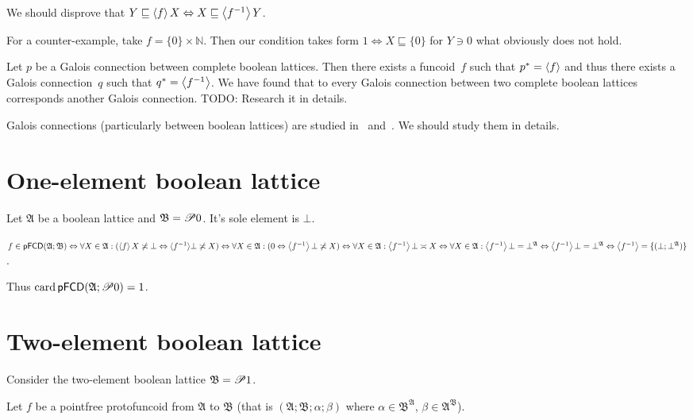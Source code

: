 We should disprove that $Y \sqsubseteq \left\langle f\right\rangle X \Leftrightarrow X
\sqsubseteq \left\langle f^{- 1}\right\rangle Y$.

For a counter-example, take $f = \{ 0 \} \times \mathbb{N}$. Then our
condition takes form $1 \Leftrightarrow X \sqsubseteq \{ 0 \}$ for $Y \ni 0$
what obviously does not hold.

Let $p$ be a Galois connection between complete boolean lattices. Then
there exists a funcoid~$f$ such that $p^\ast = \left\langle f\right\rangle$ and thus there exists
a Galois connection~$q$ such that $q^\ast = \left\langle f^{-1}\right\rangle$. We have found that
to every Galois connection between two complete boolean lattices corresponds
another Galois connection. TODO: Research it in details.

Galois connections (particularly between boolean lattices) are studied in~\cite{tprod-dist-lat}
and~\cite{shmuely1974}. We should study them in details.

\section{One-element boolean lattice}

Let $\mathfrak{A}$ be a boolean lattice and $\mathfrak{B}= \mathscr{P} 0$.
It's sole element is $\bot$.

$f \in \mathsf{pFCD} (\mathfrak{A}; \mathfrak{B}) \Leftrightarrow \forall X \in
\mathfrak{A}: (\left\langle f\right\rangle X \not\asymp \bot \Leftrightarrow \langle f^{-
1} \rangle \bot \not\asymp X) \Leftrightarrow \forall X \in \mathfrak{A}: (0
\Leftrightarrow \left\langle f^{- 1}\right\rangle \bot \not\asymp X) \Leftrightarrow
\forall X \in \mathfrak{A}: \left\langle f^{- 1}\right\rangle \bot \asymp X
\Leftrightarrow \forall X \in \mathfrak{A}: \left\langle f^{- 1}\right\rangle \bot =
\bot^{\mathfrak{A}} \Leftrightarrow \left\langle f^{- 1}\right\rangle \bot =
\bot^{\mathfrak{A}} \Leftrightarrow \left\langle f^{- 1}\right\rangle = \{ (\bot ;
\bot^{\mathfrak{A}}) \}$.

Thus $\operatorname{card} \mathsf{pFCD} (\mathfrak{A}; \mathscr{P} 0) = 1$.

\section{Two-element boolean lattice}

Consider the two-element boolean lattice $\mathfrak{B}= \mathscr{P} 1$.

Let $f$ be a pointfree protofuncoid from $\mathfrak{A}$ to $\mathfrak{B}$
(that is $(\mathfrak{A};\mathfrak{B};\alpha;\beta)$ where $\alpha\in\mathfrak{B}^{\mathfrak{A}}$, $\beta\in\mathfrak{A}^{\mathfrak{B}}$).

